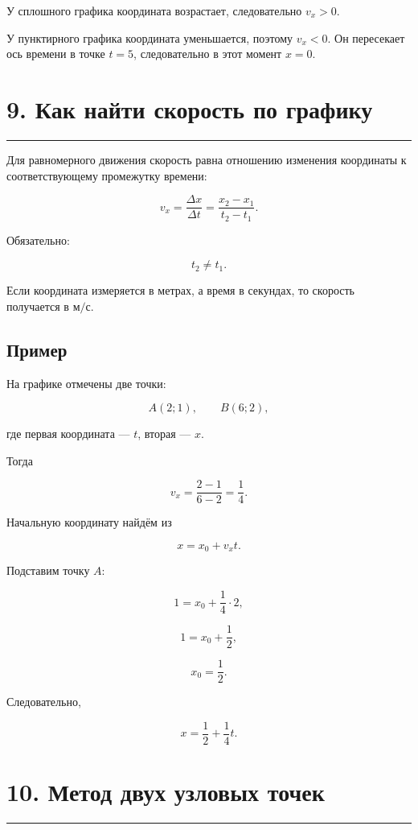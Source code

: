 \documentclass[a4paper,12pt]{article}
\newcommand{\sectionline}{%
  \par\noindent\color{accent}\rule{\linewidth}{0.5pt}\color{textgray}\par
}
\begin{document}
У сплошного графика координата возрастает, следовательно \(v_x>0\).

У пунктирного графика координата уменьшается, поэтому \(v_x<0\).
Он пересекает ось времени в точке \(t=5\), следовательно в этот момент \(x=0\).


\section{\color{darkaccent}9. Как найти скорость по графику}
\sectionline

Для равномерного движения скорость равна отношению изменения координаты
к соответствующему промежутку времени:

\[
\boxed{
v_x=\frac{\Delta x}{\Delta t}
=
\frac{x_2-x_1}{t_2-t_1}
}.
\]

Обязательно:

\[
t_2\neq t_1.
\]

Если координата измеряется в метрах, а время в секундах, то скорость
получается в \(\text{м/с}\).

\subsection*{Пример}

На графике отмечены две точки:

\[
A(2;1),\qquad B(6;2),
\]

где первая координата --- \(t\), вторая --- \(x\).

Тогда

\[
v_x=\frac{2-1}{6-2}
=\frac14.
\]

Начальную координату найдём из

\[
x=x_0+v_xt.
\]

Подставим точку \(A\):

\[
1=x_0+\frac14\cdot2,
\]

\[
1=x_0+\frac12,
\]

\[
\boxed{x_0=\frac12}.
\]

Следовательно,

\[
\boxed{x=\frac12+\frac14t}.
\]


\section{\color{darkaccent}10. Метод двух узловых точек}
\sectionline
\end{document}
